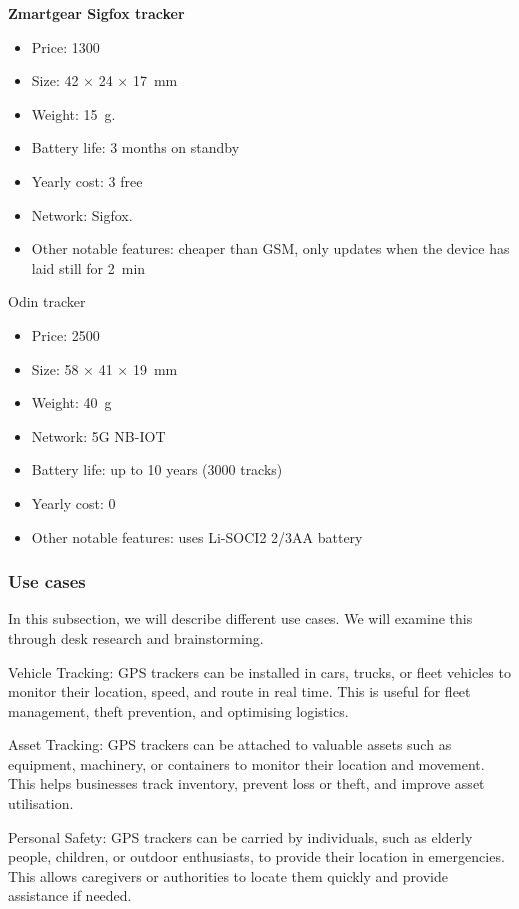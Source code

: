 \textbf{Zmartgear Sigfox tracker}
\begin{itemize}[label={}, noitemsep, leftmargin=0pt]
    \item Price: \SI{1300}{\dkk}
    \item Size: \si{42} × \si{24} × \SI{17}{\milli\meter}
    \item Weight: \SI{15}{\gram}.
    \item Battery life: 3 months on standby
    \item Yearly cost: \SI{3}{\year} free
    \item Network: Sigfox.
    \item Other notable features: cheaper than GSM, only updates when the device has laid still for \SI{2}{\minute}
\end{itemize}

Odin tracker
\begin{itemize}[label={}, noitemsep, leftmargin=0pt]
    \item Price: \SI{2500}{\dkk}
    \item Size: \si{58} × \si{41} × \SI{19}{\milli\meter}
    \item Weight: \SI{40}{\gram}
    \item Network: 5G NB-IOT
    \item Battery life: up to 10 years (3000 tracks)
    \item Yearly cost: 0
    \item Other notable features: uses Li-SOCI2 2/3AA battery
\end{itemize}
\fi

\subsubsection{Use cases}
In this subsection, we will describe different use cases. We will examine this through desk research and brainstorming.

Vehicle Tracking: \ac{GPS} trackers can be installed in cars, trucks, or fleet vehicles to monitor their location, speed, and route in real time. This is useful for fleet management, theft prevention, and optimising logistics.

Asset Tracking: \ac{GPS} trackers can be attached to valuable assets such as equipment, machinery, or containers to monitor their location and movement. This helps businesses track inventory, prevent loss or theft, and improve asset utilisation.

Personal Safety: \ac{GPS} trackers can be carried by individuals, such as elderly people, children, or outdoor enthusiasts, to provide their location in emergencies. This allows caregivers or authorities to locate them quickly and provide assistance if needed.

